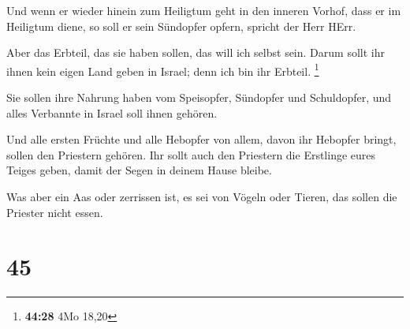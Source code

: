  Und wenn er wieder hinein zum Heiligtum geht in den
inneren Vorhof, dass er im Heiligtum diene, so soll er sein Sündopfer
opfern, spricht der Herr HErr.

 Aber das Erbteil, das sie haben sollen, das will ich
selbst sein. Darum sollt ihr ihnen kein eigen Land geben in Israel; denn
ich bin ihr Erbteil. \footnote{\textbf{44:28} 4Mo 18,20}

 Sie sollen ihre Nahrung haben vom Speisopfer, Sündopfer
und Schuldopfer, und alles Verbannte in Israel soll ihnen gehören.

 Und alle ersten Früchte und alle Hebopfer von allem,
davon ihr Hebopfer bringt, sollen den Priestern gehören. Ihr sollt auch
den Priestern die Erstlinge eures Teiges geben, damit der Segen in
deinem Hause bleibe.

 Was aber ein Aas oder zerrissen ist, es sei von Vögeln
oder Tieren, das sollen die Priester nicht essen.

\hypertarget{section-44}{%
\section{45}\label{section-44}}

